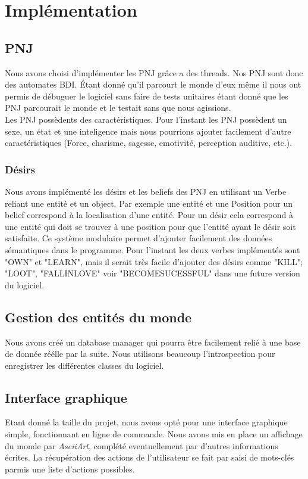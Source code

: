 \documentclass[asi]{picINSA}
\begin{document}
\chapter{Implémentation}

\section{PNJ}

Nous avons choisi d'implémenter les PNJ grâce a des threads. Nos PNJ sont donc des automates BDI. Étant donné qu'il parcourt le monde d'eux même il nous ont permis de débuguer le logiciel sans faire de tests unitaires étant donné que les PNJ parcourait le monde et le testait sans que nous agissions. \\

Les PNJ possèdents des caractéristiques. Pour l'instant les PNJ possèdent un sexe, un état et une inteligence mais nous pourrions ajouter facilement d'autre caractéristiques (Force, charisme, sagesse, emotivité, perception auditive, etc.).

\subsection{Désirs}

Nous avons implémenté les désirs et les beliefs des PNJ en utilisant un Verbe reliant une entité et un object. Par exemple une entité et une Position pour un belief correspond à la localisation d'une entité. Pour un désir cela correspond à une entité qui doit se trouver à une position pour que l'entité ayant le désir soit satisfaite. Ce système modulaire permet d'ajouter facilement des données sémantiques dans le programme. Pour l'instant les deux verbes implémentés sont "OWN" et "LEARN", mais il serait très facile d'ajouter des désirs comme "KILL"; "LOOT", "FALLINLOVE" voir "BECOMESUCESSFUL" dans une future version du logiciel.

\section{Gestion des entités du monde}

Nous avons créé un database manager qui pourra être facilement relié à une base de donnée réélle par la suite. Nous utilisons beaucoup l'introspection pour enregistrer les différentes classes du logiciel.

\section{Interface graphique}
Etant donné la taille du projet, nous avons opté pour une interface graphique simple, fonctionnant en ligne de commande. Nous avons mis en place un affichage du monde par \textit{AsciiArt}, complété eventuellement par d'autres informations écrites. La récupération des actions de l'utilisateur se fait par saisi de mots-clés parmis une liste d'actions possibles.
\end{document}
